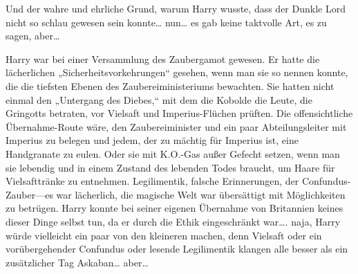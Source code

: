 Und der wahre und ehrliche Grund, warum Harry wusste, dass der Dunkle Lord nicht so schlau gewesen sein konnte… nun… es gab keine taktvolle Art, es zu sagen, aber…

Harry war bei einer Versammlung des Zaubergamot gewesen. Er hatte die lächerlichen „Sicherheitsvorkehrungen“ gesehen, wenn man sie so nennen konnte, die die tiefsten Ebenen des Zaubereiministeriums bewachten. Sie hatten nicht einmal den „Untergang des Diebes,“ mit dem die Kobolde die Leute, die Gringotts betraten, vor Vielsaft und Imperius-Flüchen prüften. Die offensichtliche Übernahme-Route wäre, den Zaubereiminister und ein paar Abteilungsleiter mit Imperius zu belegen und jedem, der zu mächtig für Imperius ist, eine Handgranate zu eulen. Oder sie mit K.O.-Gas außer Gefecht setzen, wenn man sie lebendig und in einem Zustand des lebenden Todes braucht, um Haare für Vielsafttränke zu entnehmen. Legilimentik, falsche Erinnerungen, der Confundus-Zauber—es war lächerlich, die magische Welt war übersättigt mit Möglichkeiten zu betrügen. Harry konnte bei seiner eigenen Übernahme von Britannien keines dieser Dinge selbst tun, da er durch die Ethik eingeschränkt war…. naja, Harry würde vielleicht ein paar von den kleineren machen, denn Vielsaft oder ein vorübergehender Confundus oder lesende Legilimentik klangen alle besser als ein zusätzlicher Tag Askaban… aber…

